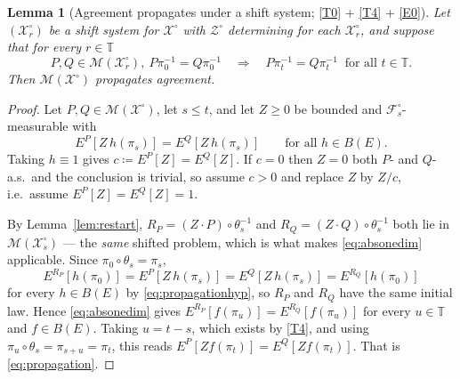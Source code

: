 \documentclass[11pt,a4paper]{article}
\theoremstyle{plain}
\newtheorem{lemma}[theorem]{Lemma}
\theoremstyle{definition}
\theoremstyle{remark}
\newcommand{\T}{\mathbb{T}}                     %
\newcommand{\Bdd}{B}                           %
\newcommand{\Filt}{\mathcal{F}}
\newcommand{\XX}{\mathcal{X}}                  %
\newcommand{\ZZ}{\mathcal{Z}}                  %
\newcommand{\Msol}{\mathcal{M}}
\begin{document}
\begin{lemma}[Agreement propagates under a shift system; \eqref{T0} + \eqref{T4} + \eqref{E0}]
  \label{lem:propagation}
  Let $(\XX^\circ_r)$ be a shift system for $\XX^\circ$ with $\ZZ^\circ$
  determining for each $\XX^\circ_r$, and suppose that for every $r \in \T$
  \begin{equation}
    \label{eq:absonedim}
    P, Q \in \Msol(\XX^\circ_r), \ P \pi_0^{-1} = Q \pi_0^{-1}
    \quad \Longrightarrow \quad
    P \pi_t^{-1} = Q \pi_t^{-1} \ \text{ for all } t \in \T .
  \end{equation}
  Then $\Msol(\XX^\circ)$ propagates agreement.
\end{lemma}

\begin{proof}
  Let $P, Q \in \Msol(\XX^\circ)$, let $s \leq t$, and let $Z \geq 0$ be bounded
  and $\Filt^\circ_s$-measurable with
  \begin{equation}
    \label{eq:propagationhyp}
    E^P[Z\,h(\pi_s)] = E^Q[Z\,h(\pi_s)] \qquad \text{for all } h \in \Bdd(E) .
  \end{equation}
  Taking $h \equiv 1$ gives $c \coloneqq E^P[Z] = E^Q[Z]$.  If $c = 0$ then
  $Z = 0$ both $P$- and $Q$-a.s.\ and the conclusion is trivial, so assume
  $c > 0$ and replace $Z$ by $Z/c$, i.e.\ assume $E^P[Z] = E^Q[Z] = 1$.

  By Lemma~\ref{lem:restart}, $R_P = (Z\cdot P)\circ\theta_s^{-1}$ and
  $R_Q = (Z\cdot Q)\circ\theta_s^{-1}$ both lie in $\Msol(\XX^\circ_s)$ --- the
  \emph{same} shifted problem, which is what makes \eqref{eq:absonedim}
  applicable.  Since $\pi_0 \circ \theta_s = \pi_s$,
  \[
    E^{R_P}[h(\pi_0)] = E^P[Z\,h(\pi_s)] = E^Q[Z\,h(\pi_s)] = E^{R_Q}[h(\pi_0)]
  \]
  for every $h \in \Bdd(E)$ by \eqref{eq:propagationhyp}, so $R_P$ and $R_Q$ have
  the same initial law.  Hence \eqref{eq:absonedim} gives
  $E^{R_P}[f(\pi_u)] = E^{R_Q}[f(\pi_u)]$ for every $u \in \T$ and
  $f \in \Bdd(E)$.  Taking $u = t - s$, which exists by \eqref{T4}, and using
  $\pi_u \circ \theta_s = \pi_{s+u} = \pi_t$, this reads
  $E^P[Z f(\pi_t)] = E^Q[Z f(\pi_t)]$.  That is \eqref{eq:propagation}.
\end{proof}
\end{document}

